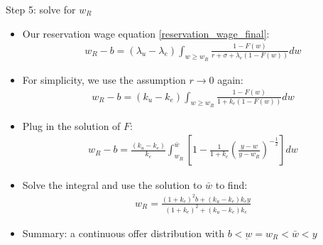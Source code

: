 \documentclass[9pt]{beamer}
\newcommand{\bit}{\begin{itemize}}
\newcommand{\eit}{\end{itemize}}
\begin{document}
\begin{frame}{Step 5: solve for $w_R$}

\bit
\setlength\itemsep{1.5em}

\item Our reservation wage equation \eqref{reservation_wage_final}:
\begin{eqnarray}
w_R-b = (\lambda_u-\lambda_e) \int_{w \geq w_R}\frac{1-F(w)}{r+\sigma + \lambda_e(1-F(w))} dw \nonumber
\end{eqnarray}
\item For simplicity, we use the assumption $r \rightarrow 0$ again: 
\begin{eqnarray}
w_R-b = (k_u-k_e) \int_{w \geq w_R}\frac{1-F(w)}{1 + k_e(1-F(w))} dw \nonumber
\end{eqnarray}
\item Plug in the solution of $F$:
\begin{eqnarray}
w_R-b = \frac{(k_u-k_e)}{k_e} \int_{w_R}^{\bar w} \left[1-\frac{1}{1+k_e} \left( \frac{y-w}{y-w_R}\right)^{-\frac{1}{2}}\right]dw \nonumber
\end{eqnarray}
\item Solve the integral and use the solution to $\bar w$ to find:
\begin{eqnarray}
w_R = \frac{(1+k_e)^2b + (k_u-k_e)k_ey}{(1+k_e)^2+(k_u-k_e)k_e}
\end{eqnarray}

\item Summary: a continuous offer distribution with $b < \underbar w = w_R < \bar w < y$
\eit


\end{frame}
\end{document}
